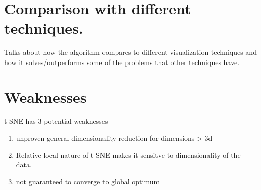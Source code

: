 \documentclass[11pt]{article}
\begin{document}
\section{Comparison with different techniques.}
\label{sec:org0c40250}
Talks about how the algorithm compares to different visualization techniques and how it solves/outperforms some of the problems that other techniques have.
\section{Weaknesses}
\label{sec:orgb98f356}
t-SNE has 3 potential weaknesses
\begin{enumerate}
\item unproven general dimensionality reduction for dimensions > 3d
\item Relative local nature of t-SNE makes it sensitve to dimensionality of the data.
\item not guaranteed to converge to global optimum
\end{enumerate}
\end{document}
